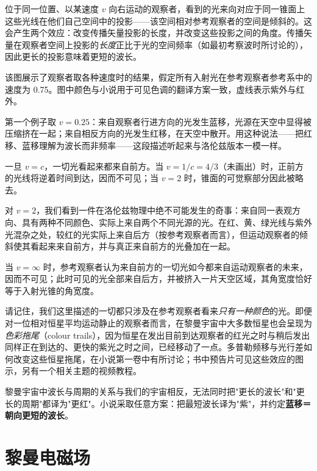 位于同一位置、以某速度 $v$ 向右运动的观察者，看到的光来向对应于同一锥面上这些光线在他们自己空间中的投影——该空间相对参考观察者的空间是倾斜的。这会产生两个效应：改变传播矢量投影的长度，并改变这些投影之间的角度。传播矢量在观察者空间上投影的\emph{长度}正比于光的空间频率（如最初考察波时所讨论的），因此更长的投影意味着更短的波长。


该图展示了观察者取各种速度时的结果，假定所有入射光在参考观察者参考系中的速度为 0.75。图中颜色与小说用于可见色调的翻译方案一致，虚线表示紫外与红外。

第一个例子取 $v = 0.25$：来自观察者行进方向的光发生蓝移，光源在天空中显得被压缩挤在一起；来自相反方向的光发生红移，在天空中散开。用这种说法——把红移、蓝移理解为波长而非频率——这段描述听起来与洛伦兹版本一模一样。

一旦 $v = c$，一切光看起来都来自前方。当 $v = 1/c = 4/3$（未画出）时，正前方的光线将逆着时间到达，因而不可见；当 $v = 2$ 时，锥面的可觉察部分因此被略去。

对 $v = 2$，我们看到一件在洛伦兹物理中绝不可能发生的奇事：来自同一表观方向、具有两种不同颜色、实际上来自两个不同光源的光。在红、黄、绿光线与紫外光混杂之处，较红的光实际上来自后方（按参考观察者而言），但运动观察者的倾斜使其看起来来自前方，并与真正来自前方的光叠加在一起。

当 $v = \infty$ 时，参考观察者认为来自前方的一切光如今都来自运动观察者的未来，因而不可见；此时可见的光全部来自后方，并被挤入一片天空区域，其角宽度恰好等于入射光锥的角宽度。

请记住，我们这里描述的一切都只涉及在参考观察者看来\emph{只有一种颜色}的光。即便对一位相对恒星平均运动静止的观察者而言，在黎曼宇宙中大多数恒星也会呈现为\emph{色彩拖尾}（colour trails），因为恒星在发出目前到达观察者的红光之时与稍后发出同样正在到达的、更快的紫光之时之间，已经移动了一点。多普勒频移与光行差如何改变这些恒星拖尾，在小说第一卷中有所讨论；书中预告片可见这些效应的图示，另有一个相关主题的视频教程。

\begin{notebox}[术语约定]
黎曼宇宙中波长与周期的关系与我们的宇宙相反，无法同时把"更长的波长"和"更长的周期"都译为"更红"。小说采取任意方案：把最短波长译为"紫"，并约定\textbf{蓝移＝朝向更短的波长}。
\end{notebox}

\section{黎曼电磁场}

